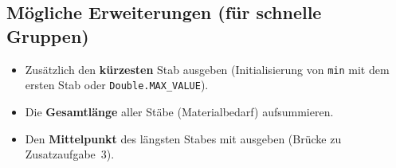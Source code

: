 \documentclass[
	fontsize=12pt,          %
	paper=a4,               %
	numbers=noenddot,       %
	listof=totoc,           %
	listof=entryprefix,     %
	listof=nochaptergap,    %
	bibliography=totoc,     %
	parskip=half            %
	openany                 %
]{scrbook}
\begin{document}
\subsection*{Mögliche Erweiterungen (für schnelle Gruppen)}

\begin{itemize}[nosep]
	\item Zusätzlich den \textbf{kürzesten} Stab ausgeben (Initialisierung von \texttt{min} mit dem ersten Stab oder \texttt{Double.MAX\_VALUE}).
	\item Die \textbf{Gesamtlänge} aller Stäbe (Materialbedarf) aufsummieren.
	\item Den \textbf{Mittelpunkt} des längsten Stabes mit ausgeben (Brücke zu Zusatzaufgabe~3).
\end{itemize}
\end{document}
